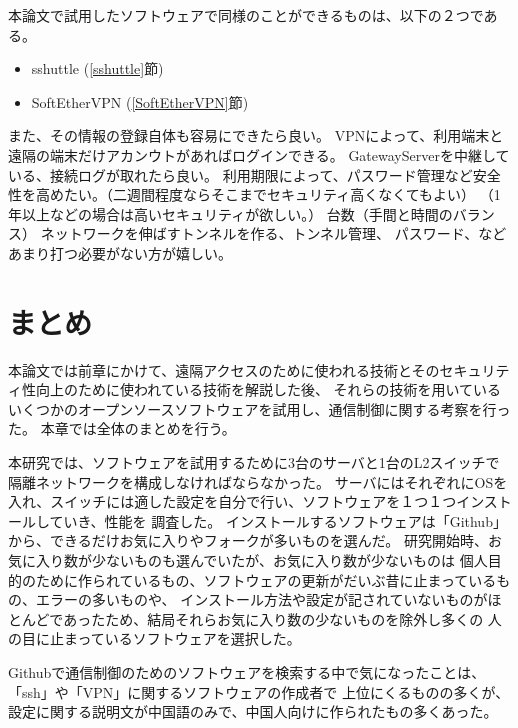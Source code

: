 \documentclass[11pt,a4j,titlepage]{jreport}
\begin{document}
\par 本論文で試用したソフトウェアで同様のことができるものは、以下の２つである。
\begin{itemize}
    \item sshuttle (\ref{sshuttle}節)
    \item SoftEtherVPN (\ref{SoftEtherVPN}節)
\end{itemize}\par

また、その情報の登録自体も容易にできたら良い。
VPNによって、利用端末と遠隔の端末だけアカンウトがあればログインできる。
GatewayServerを中継している、接続ログが取れたら良い。
利用期限によって、パスワード管理など安全性を高めたい。（二週間程度ならそこまでセキュリティ高くなくてもよい）
（1年以上などの場合は高いセキュリティが欲しい。）
台数（手間と時間のバランス）
ネットワークを伸ばすトンネルを作る、トンネル管理、
パスワード、などあまり打つ必要がない方が嬉しい。
\fi


\chapter{まとめ}
本論文では前章にかけて、遠隔アクセスのために使われる技術とそのセキュリティ性向上のために使われている技術を解説した後、
それらの技術を用いているいくつかのオープンソースソフトウェアを試用し、通信制御に関する考察を行った。
本章では全体のまとめを行う。\par
本研究では、ソフトウェアを試用するために3台のサーバと1台のL2スイッチで隔離ネットワークを構成しなければならなかった。
サーバにはそれぞれにOSを入れ、スイッチには適した設定を自分で行い、ソフトウェアを１つ１つインストールしていき、性能を
調査した。
インストールするソフトウェアは「Github」から、できるだけお気に入りやフォークが多いものを選んだ。
研究開始時、お気に入り数が少ないものも選んでいたが、お気に入り数が少ないものは
個人目的のために作られているもの、ソフトウェアの更新がだいぶ昔に止まっているもの、エラーの多いものや、
インストール方法や設定が記されていないものがほとんどであったため、結局それらお気に入り数の少ないものを除外し多くの
人の目に止まっているソフトウェアを選択した。

Githubで通信制御のためのソフトウェアを検索する中で気になったことは、「ssh」や「VPN」に関するソフトウェアの作成者で
上位にくるものの多くが、設定に関する説明文が中国語のみで、中国人向けに作られたもの多くあった。

\fi
\end{document}
